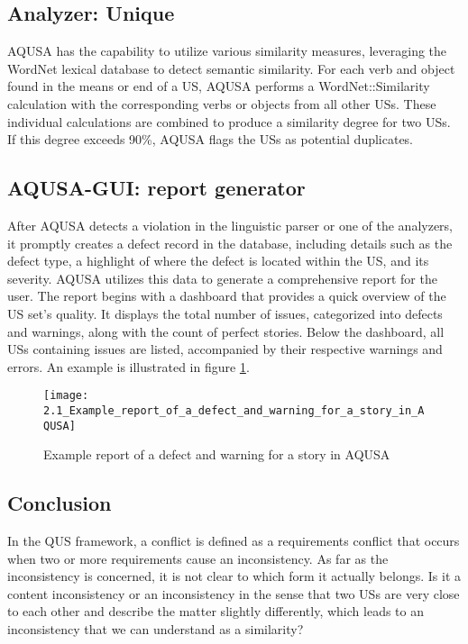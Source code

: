 \subsection*{\normalsize{Analyzer: Unique}}
AQUSA has the capability to utilize various similarity measures, leveraging the WordNet lexical database to detect semantic similarity. For each verb and object found in the means or end of a US, AQUSA performs a WordNet::Similarity calculation with the corresponding verbs or objects from all other USs. These individual calculations are combined to produce a similarity degree for two USs. If this degree exceeds 90\%, AQUSA flags the USs as potential duplicates. 
\subsection*{\normalsize{AQUSA-GUI: report generator}}
After AQUSA detects a violation in the linguistic parser or one of the analyzers, it promptly creates a defect record in the database, including details such as the defect type, a highlight of where the defect is located within the US, and its severity. AQUSA utilizes this data to generate a comprehensive report for the user.
The report begins with a dashboard that provides a quick overview of the US set's quality. It displays the total number of issues, categorized into defects and warnings, along with the count of perfect stories. Below the dashboard, all USs containing issues are listed, accompanied by their respective warnings and errors. An example is illustrated in figure \ref{fig:aqusa_report}.
\begin{figure}[h]
\center
\texttt{[image: 2.1\_Example\_report\_of\_a\_defect\_and\_warning\_for\_a\_story\_in\_AQUSA]}
\caption{Example report of a defect and warning for a story in AQUSA \cite{lucassen2016improving}}\label{fig:aqusa_report}
\end{figure}
\subsection*{Conclusion} \label{usq_conclusion}
In the QUS framework, a conflict is defined as a requirements conflict that occurs when two or more requirements cause an inconsistency. As far as the inconsistency is concerned, it is not clear to which form it actually belongs. Is it a content inconsistency or an inconsistency in the sense that two USs are very close to each other and describe the matter slightly differently, which leads to an inconsistency that we can understand as a similarity?

